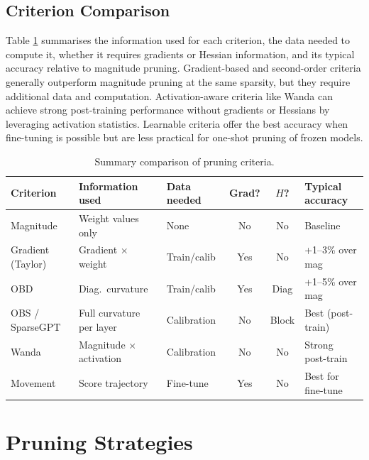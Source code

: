 \subsection{Criterion Comparison}
Table \ref{tab:criterion_comparison} summarises the information used for each criterion, the data needed to compute it, whether it requires gradients or Hessian information, and its typical accuracy relative to magnitude pruning.  Gradient-based and second-order criteria generally outperform magnitude pruning at the same sparsity, but they require additional data and computation.  Activation-aware criteria like Wanda can achieve strong post-training performance without gradients or Hessians by leveraging activation statistics.  Learnable criteria offer the best accuracy when fine-tuning is possible but are less practical for one-shot pruning of frozen models.
\begin{table}[H]
	\centering
	\caption{Summary comparison of pruning criteria.}
	\label{tab:criterion_comparison}
	\renewcommand{\arraystretch}{1.5}
	\begin{tabularx}{\textwidth}{lXXccl}
		\toprule
		\textbf{Criterion} & \textbf{Information used}
		& \textbf{Data needed}
		& \textbf{Grad?} & \textbf{$H$?}
		& \textbf{Typical accuracy} \\
		\midrule
		Magnitude & Weight values only
		& None & No & No & Baseline \\
		Gradient (Taylor) & Gradient $\times$ weight
		& Train/calib & Yes & No & +1--3\% over mag \\
		OBD & Diag.\ curvature
		& Train/calib & Yes & Diag & +1--5\% over mag \\
		OBS / SparseGPT & Full curvature per layer
		& Calibration & No & Block & Best (post-train) \\
		Wanda & Magnitude $\times$ activation
		& Calibration & No & No & Strong post-train \\
		Movement & Score trajectory
		& Fine-tune & Yes & No & Best for fine-tune \\
		\bottomrule
	\end{tabularx}
\end{table}

\section{Pruning Strategies}

